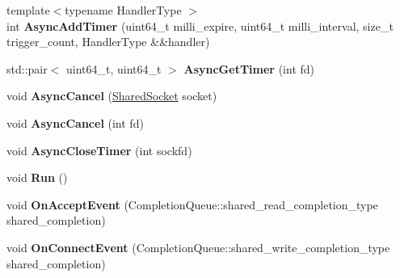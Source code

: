 \begin{DoxyCompactItemize}
\item 
\hypertarget{classlsf_1_1asio_1_1async_1_1ProactorSerivce_a45a28f612525128216e1b08e8fded891}{
{\footnotesize template$<$typename HandlerType $>$ }\\int {\bfseries AsyncAddTimer} (uint64\_\-t milli\_\-expire, uint64\_\-t milli\_\-interval, size\_\-t trigger\_\-count, HandlerType \&\&handler)}
\label{classlsf_1_1asio_1_1async_1_1ProactorSerivce_a45a28f612525128216e1b08e8fded891}

\item 
\hypertarget{classlsf_1_1asio_1_1async_1_1ProactorSerivce_a345c811991813881ea529b8bb11131d6}{
std::pair$<$ uint64\_\-t, uint64\_\-t $>$ {\bfseries AsyncGetTimer} (int fd)}
\label{classlsf_1_1asio_1_1async_1_1ProactorSerivce_a345c811991813881ea529b8bb11131d6}

\item 
\hypertarget{classlsf_1_1asio_1_1async_1_1ProactorSerivce_aac0d6b22e353022d75bc4e8437dfa5cc}{
void {\bfseries AsyncCancel} (\hyperlink{classlsf_1_1asio_1_1SharedSocket}{SharedSocket} socket)}
\label{classlsf_1_1asio_1_1async_1_1ProactorSerivce_aac0d6b22e353022d75bc4e8437dfa5cc}

\item 
\hypertarget{classlsf_1_1asio_1_1async_1_1ProactorSerivce_a5a82488543f1ee18cc83763c8f170a63}{
void {\bfseries AsyncCancel} (int fd)}
\label{classlsf_1_1asio_1_1async_1_1ProactorSerivce_a5a82488543f1ee18cc83763c8f170a63}

\item 
\hypertarget{classlsf_1_1asio_1_1async_1_1ProactorSerivce_a0633c96e82a7758c088d65a4b831774f}{
void {\bfseries AsyncCloseTimer} (int sockfd)}
\label{classlsf_1_1asio_1_1async_1_1ProactorSerivce_a0633c96e82a7758c088d65a4b831774f}

\item 
\hypertarget{classlsf_1_1asio_1_1async_1_1ProactorSerivce_a92e86ffd3479d070017bd2ec8cbc4ba1}{
void {\bfseries Run} ()}
\label{classlsf_1_1asio_1_1async_1_1ProactorSerivce_a92e86ffd3479d070017bd2ec8cbc4ba1}

\item 
\hypertarget{classlsf_1_1asio_1_1async_1_1ProactorSerivce_a7cb28747d2836490ea6dec0825828e41}{
void {\bfseries OnAcceptEvent} (CompletionQueue::shared\_\-read\_\-completion\_\-type shared\_\-completion)}
\label{classlsf_1_1asio_1_1async_1_1ProactorSerivce_a7cb28747d2836490ea6dec0825828e41}

\item 
\hypertarget{classlsf_1_1asio_1_1async_1_1ProactorSerivce_a11bcfac500734a98428747a09910d621}{
void {\bfseries OnConnectEvent} (CompletionQueue::shared\_\-write\_\-completion\_\-type shared\_\-completion)}
\label{classlsf_1_1asio_1_1async_1_1ProactorSerivce_a11bcfac500734a98428747a09910d621}


\end{DoxyCompactItemize}
